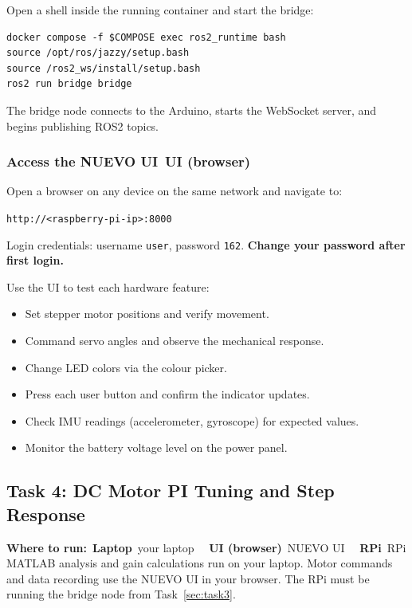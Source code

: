 \documentclass{ol-softwaremanual}
\newcommand{\onlaptop}{%
  \,\colorbox{green!25}{\footnotesize\sffamily\bfseries Laptop}}
\newcommand{\onrpi}{%
  \,\colorbox{blue!20}{\footnotesize\sffamily\bfseries RPi}}
\newcommand{\onui}{%
  \,\colorbox{yellow!50}{\footnotesize\sffamily\bfseries UI (browser)}}
\newcommand{\machinebox}[2]{%
  \par\noindent
  \colorbox{gray!12}{\parbox{\dimexpr\linewidth-2\fboxsep}{%
    \small\sffamily\textbf{Where to run:} #1 \quad\textbar\quad #2}}%
  \par\smallskip}
\begin{document}
Open a shell inside the running container and start the bridge:

\begin{verbatim}
docker compose -f $COMPOSE exec ros2_runtime bash
source /opt/ros/jazzy/setup.bash
source /ros2_ws/install/setup.bash
ros2 run bridge bridge
\end{verbatim}

The bridge node connects to the Arduino, starts the WebSocket server, and begins
publishing ROS2 topics.

\subsubsection{Access the NUEVO UI\onui}

Open a browser on any device on the same network and navigate to:
\begin{center}
  \texttt{http://<raspberry-pi-ip>:8000}
\end{center}

Login credentials: username \texttt{user}, password \texttt{162}.
\textbf{Change your password after first login.}

Use the UI to test each hardware feature:
\begin{itemize}
  \item Set stepper motor positions and verify movement.
  \item Command servo angles and observe the mechanical response.
  \item Change LED colors via the colour picker.
  \item Press each user button and confirm the indicator updates.
  \item Check IMU readings (accelerometer, gyroscope) for expected values.
  \item Monitor the battery voltage level on the power panel.
\end{itemize}


\subsection{Task 4: DC Motor PI Tuning and Step Response}\label{sec:task4}

\machinebox{\onlaptop\ your laptop \textbar\ \onui\ NUEVO UI \textbar\ \onrpi\ RPi}{MATLAB analysis and gain calculations run on your laptop. Motor commands and data recording use the NUEVO UI in your browser. The RPi must be running the bridge node from Task~\ref{sec:task3}.}
\end{document}
